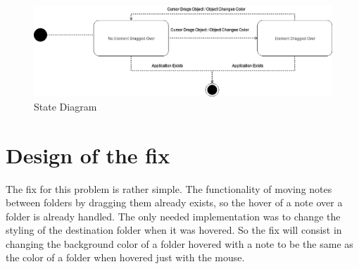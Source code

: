\begin{figure}
\centering
\includegraphics[width=6.25000in]{../stateDiagram.png}
\caption{State Diagram}
\end{figure}

\section{Design of the fix}\label{design-of-the-fix-1}

The fix for this problem is rather simple. The functionality of moving
notes between folders by dragging them already exists, so the hover of a
note over a folder is already handled. The only needed implementation
was to change the styling of the destination folder when it was hovered.
So the fix will consist in changing the background color of a folder
hovered with a note to be the same as the color of a folder when hovered
just with the mouse.
